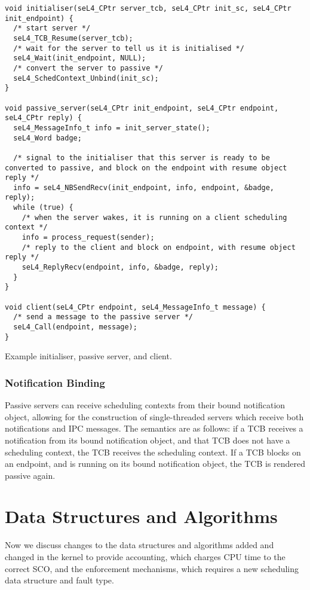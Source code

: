 \begin{listing}[t]
\begin{verbatim}
void initialiser(seL4_CPtr server_tcb, seL4_CPtr init_sc, seL4_CPtr init_endpoint) {
  /* start server */
  seL4_TCB_Resume(server_tcb);
  /* wait for the server to tell us it is initialised */
  seL4_Wait(init_endpoint, NULL);
  /* convert the server to passive */
  seL4_SchedContext_Unbind(init_sc);
}

void passive_server(seL4_CPtr init_endpoint, seL4_CPtr endpoint, seL4_CPtr reply) {  
  seL4_MessageInfo_t info = init_server_state();
  seL4_Word badge;

  /* signal to the initialiser that this server is ready to be converted to passive, and block on the endpoint with resume object reply */
  info = seL4_NBSendRecv(init_endpoint, info, endpoint, &badge, reply);
  while (true) {
    /* when the server wakes, it is running on a client scheduling context */
    info = process_request(sender);
    /* reply to the client and block on endpoint, with resume object reply */
    seL4_ReplyRecv(endpoint, info, &badge, reply);
  }
}

void client(seL4_CPtr endpoint, seL4_MessageInfo_t message) {
  /* send a message to the passive server */
  seL4_Call(endpoint, message);
}
\end{verbatim}
\caption{Example initialiser, passive server, and client.}
\label{list:passive-server}
\end{listing}

\subsubsection{Notification Binding}

Passive servers can receive scheduling contexts from their bound notification object, allowing for
the construction of single-threaded servers which receive both notifications and IPC messages. 
The semantics are as follows: if a TCB receives a notification from its bound notification
object, and that TCB does not have a scheduling context, the TCB receives the scheduling context.
If a TCB blocks on an endpoint, and is running on its bound notification object, the TCB is
rendered passive again. 

\section{Data Structures and Algorithms}

Now we discuss changes to the data structures and algorithms added and changed in the kernel to provide
accounting, which charges CPU time to the correct \gls{SCO}, and the enforcement mechanisms, which requires
a new scheduling data structure and fault type.

